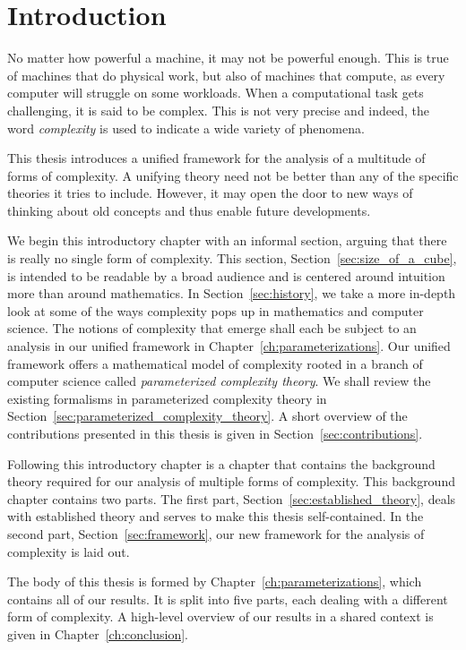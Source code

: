 \chapter{Introduction}

No matter how powerful a machine, it may not be powerful enough.
This is true of machines that do physical work, but also of machines that compute, as every computer will struggle on some workloads.
When a computational task gets challenging, it is said to be complex.
This is not very precise and indeed, the word \emph{complexity} is used to indicate a wide variety of phenomena.

This thesis introduces a unified framework for the analysis of a multitude of forms of complexity.
A unifying theory need not be better than any of the specific theories it tries to include.
However, it may open the door to new ways of thinking about old concepts and thus enable future developments.

We begin this introductory chapter with an informal section, arguing that there is really no single form of complexity.
This section, Section~\ref{sec:size_of_a_cube}, is intended to be readable by a broad audience and is centered around intuition more than around mathematics.
In Section~\ref{sec:history}, we take a more in-depth look at some of the ways complexity pops up in mathematics and computer science.
The notions of complexity that emerge shall each be subject to an analysis in our unified framework in Chapter~\ref{ch:parameterizations}.
Our unified framework offers a mathematical model of complexity rooted in a branch of computer science called \emph{parameterized complexity theory}.
We shall review the existing formalisms in parameterized complexity theory in Section~\ref{sec:parameterized_complexity_theory}.
A short overview of the contributions presented in this thesis is given in Section~\ref{sec:contributions}.

Following this introductory chapter is a chapter that contains the background theory required for our analysis of multiple forms of complexity.
This background chapter contains two parts.
The first part, Section~\ref{sec:established_theory}, deals with established theory and serves to make this thesis self-contained.
In the second part, Section~\ref{sec:framework}, our new framework for the analysis of complexity is laid out.

The body of this thesis is formed by Chapter~\ref{ch:parameterizations}, which contains all of our results.
It is split into five parts, each dealing with a different form of complexity.
A high-level overview of our results in a shared context is given in Chapter~\ref{ch:conclusion}.


